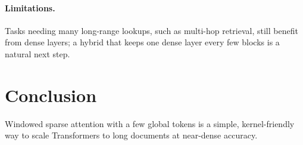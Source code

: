\documentclass[11pt]{article}
\begin{document}
\paragraph{Limitations.} Tasks needing many long-range lookups, such as multi-hop
retrieval, still benefit from dense layers; a hybrid that keeps one dense layer every
few blocks is a natural next step.

\section{Conclusion}
Windowed sparse attention with a few global tokens is a simple, kernel-friendly way to
scale Transformers to long documents at near-dense accuracy.
\end{document}

